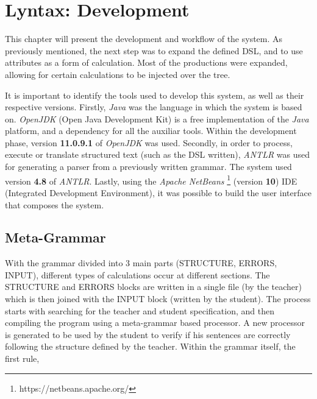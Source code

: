 \chapter{Lyntax: Development} \label{lyntax_development}

This chapter will present the development and workflow of the system. 
As previously mentioned, the next step was to expand the defined DSL, and to use attributes as a form of calculation. 
Most of the productions were expanded, allowing for certain calculations to be injected over the tree.

It is important to identify the tools used to develop this system, as well as their respective versions.
Firstly, \emph{Java} was the language in which the system is based on. 
\emph{OpenJDK} (Open Java Development Kit) is a free implementation of the \emph{Java} platform, and a dependency for all the auxiliar tools. 
Within the development phase, version \textbf{11.0.9.1} of \emph{OpenJDK} was used.
Secondly, in order to process, execute or translate structured text (such as the DSL written), \emph{ANTLR} was used for generating a parser from a previously written grammar. 
The system used version \textbf{4.8} of \emph{ANTLR}.
Lastly, using the \emph{Apache NetBeans} \footnote{https://netbeans.apache.org/} (version \textbf{10}) IDE (Integrated Development Environment), 
it was possible to build the user interface that composes the system.
\section{Meta-Grammar}

With the grammar divided into 3 main parts (STRUCTURE, ERRORS, INPUT), different types of calculations occur at different sections. The STRUCTURE and ERRORS blocks are written in a single file (by the teacher) which is then joined 
with the INPUT block (written by the student). The process starts with searching for the teacher and student specification, and then compiling the program using a meta-grammar based processor. A new processor is generated to be 
used by the student to verify if his sentences are correctly following the structure defined by the teacher. Within the grammar itself, the first rule, 

%

